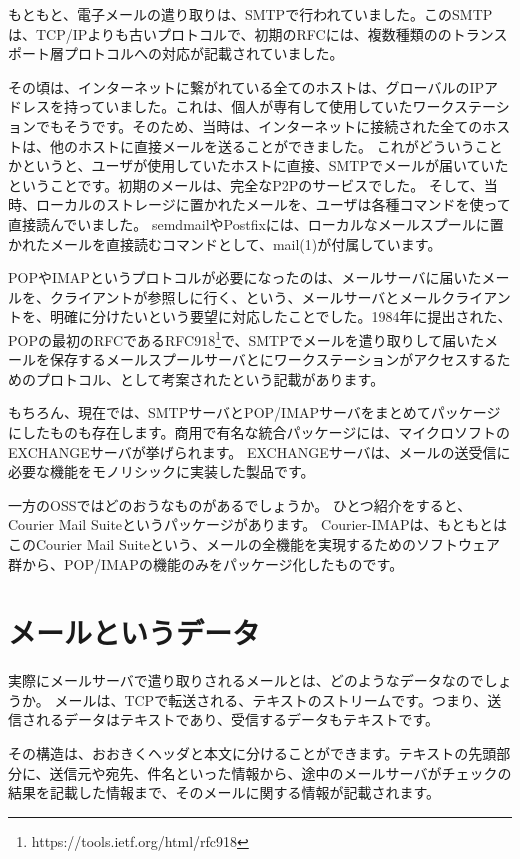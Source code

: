 もともと、電子メールの遣り取りは、SMTPで行われていました。このSMTPは、TCP/IPよりも古いプロトコルで、初期のRFCには、複数種類ののトランスポート層プロトコルへの対応が記載されていました。

その頃は、インターネットに繋がれている全てのホストは、グローバルのIPアドレスを持っていました。これは、個人が専有して使用していたワークステーションでもそうです。そのため、当時は、インターネットに接続された全てのホストは、他のホストに直接メールを送ることができました。
これがどういうことかというと、ユーザが使用していたホストに直接、SMTPでメールが届いていたということです。初期のメールは、完全なP2Pのサービスでした。
そして、当時、ローカルのストレージに置かれたメールを、ユーザは各種コマンドを使って直接読んでいました。
semdmailやPostfixには、ローカルなメールスプールに置かれたメールを直接読むコマンドとして、mail(1)が付属しています。


POPやIMAPというプロトコルが必要になったのは、メールサーバに届いたメールを、クライアントが参照しに行く、という、メールサーバとメールクライアントを、明確に分けたいという要望に対応したことでした。1984年に提出された、POPの最初のRFCであるRFC918\footnote{https://tools.ietf.org/html/rfc918}で、SMTPでメールを遣り取りして届いたメールを保存するメールスプールサーバとにワークステーションがアクセスするためのプロトコル、として考案されたという記載があります。



もちろん、現在では、SMTPサーバとPOP/IMAPサーバをまとめてパッケージにしたものも存在します。商用で有名な統合パッケージには、マイクロソフトのEXCHANGEサーバが挙げられます。
EXCHANGEサーバは、メールの送受信に必要な機能をモノリシックに実装した製品です。

一方のOSSではどのおうなものがあるでしょうか。
ひとつ紹介をすると、Courier Mail Suiteというパッケージがあります。
Courier-IMAPは、もともとはこのCourier Mail Suiteという、メールの全機能を実現するためのソフトウェア群から、POP/IMAPの機能のみをパッケージ化したものです。


\section{メールというデータ}
実際にメールサーバで遣り取りされるメールとは、どのようなデータなのでしょうか。
メールは、TCPで転送される、テキストのストリームです。つまり、送信されるデータはテキストであり、受信するデータもテキストです。

その構造は、おおきくヘッダと本文に分けることができます。テキストの先頭部分に、送信元や宛先、件名といった情報から、途中のメールサーバがチェックの結果を記載した情報まで、そのメールに関する情報が記載されます。


